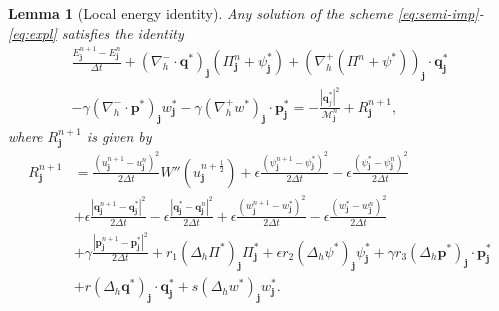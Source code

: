 \documentclass[11pt]{article}
\numberwithin{equation}{section}
\newtheorem{lemma}[theorem]{Lemma}
\newtheorem{counter example}[theorem]{Counter Example}
\numberwithin{equation}{section}
\numberwithin{equation}{section}
\begin{document}
\begin{lemma}[Local energy identity]\label{lemma: local_energy_id}
Any solution of the scheme \eqref{eq:semi-imp}-\eqref{eq:expl} satisfies the identity
\begin{equation}\label{eq: local_energy_id}
\begin{aligned}
\frac{E_{\mathbf{j}}^{n+1}-E_{\mathbf{j}}^{n}}{\Delta t}
+(\nabla_h^{-} \cdot \mathbf{q}^*)_{\mathbf{j}}(\Pi^n_{\mathbf{j}}+\psi^*_{\mathbf{j}})
+(\nabla_h^+(\Pi^n+\psi^*))_{\mathbf{j}}\cdot \mathbf{q}^*_{\mathbf{j}} \\-\gamma(\nabla_h^{-} \cdot \mathbf{p}^*)_{\mathbf{j}}w^*_{\mathbf{j}}-\gamma(\nabla_h^+ w^*)_{\mathbf{j}}\cdot \mathbf{p}^*_{\mathbf{j}}=-\frac{|\mathbf{q}_{j}^{*}|^2}{\mathcal{M}_{\mathbf{j}}^n}+R_{\mathbf{j}}^{n+1},
\end{aligned}
\end{equation}
where $R_{\mathbf{j}}^{n+1}$ is given by
\begin{equation}\label{eq:eng_remainder}
\begin{aligned}
R_{\mathbf{j}}^{n+1}
&=
\frac{(u_{\mathbf{j}}^{n+1}-u_{\mathbf{j}}^n)^2}{2 \Delta t}
W''(u_{\mathbf{j}}^{n+\frac12})
+\epsilon\frac{(\psi_{\mathbf{j}}^{n+1}-\psi^*_{\mathbf{j}})^2}{2\Delta t}
-\epsilon\frac{(\psi^*_{\mathbf{j}}-\psi^n_{\mathbf{j}})^2}{2\Delta t} \\
&+\epsilon\frac{|\mathbf{q}_{\mathbf{j}}^{n+1}-\mathbf{q}_{\mathbf{j}}^{*}|^2}{2\Delta t}
-\epsilon\frac{|\mathbf{q}_{\mathbf{j}}^{*}-\mathbf{q}_{\mathbf{j}}^{n}|^2}{2\Delta t}
+\epsilon\frac{(w_{\mathbf{j}}^{n+1}-w_{\mathbf{j}}^{*})^2}{2\Delta t}
-\epsilon\frac{(w_{\mathbf{j}}^{*}-w_{\mathbf{j}}^{n})^2}{2\Delta t} \\
&+\gamma\frac{|\mathbf{p}_{\mathbf{j}}^{n+1}-\mathbf{p}_{\mathbf{j}}^{*}|^2}{2\Delta t}
+r_1(\Delta_h \Pi^*)_{\mathbf{j}}\Pi^*_{\mathbf{j}}
+\epsilon r_2(\Delta_h \psi^*)_{\mathbf{j}}\psi^*_{\mathbf{j}}
+\gamma r_3(\Delta_h \mathbf{p}^*)_{\mathbf{j}}\cdot \mathbf{p}^*_{\mathbf{j}} \\
&+r(\Delta_{h} \mathbf{q}^*)_{\mathbf{j}}\cdot \mathbf{q}^*_{\mathbf{j}}
+s(\Delta_{h}w^*)_{\mathbf{j}}w^*_{\mathbf{j}} .
\end{aligned}
\end{equation}
\end{lemma}
\end{document}
